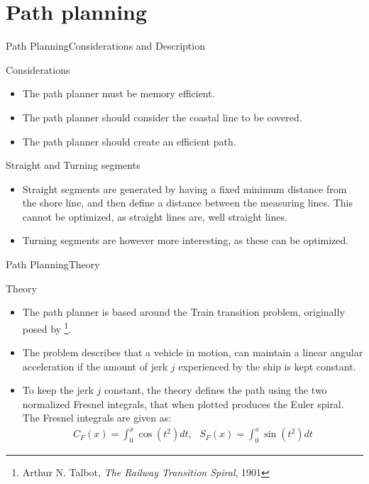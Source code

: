 \documentclass[10pt]{beamer}
\begin{document}
\section{Path planning}
\begin{frame}{Path Planning}{Considerations and Description}
    \begin{block}{Considerations}
    \begin{itemize}
    	\item The path planner must be memory efficient.
    	\item The path planner should consider the coastal line to be covered.
    	\item The path planner should create an efficient path.
    \end{itemize}
    \end{block}
    \begin{block}{Straight and Turning segments}
    \begin{itemize}
    	\item Straight segments are generated by having a fixed minimum distance from the shore line, and then define a distance between the measuring lines. This cannot be optimized, as straight lines are, well straight lines. 
    	\item Turning segments are however more interesting, as these can be optimized.
    \end{itemize}
    \end{block}
\end{frame}

\begin{frame}{Path Planning}{Theory}
  \begin{block}{Theory}
  \begin{itemize}
     \item<1-> The path planner is based around the Train transition problem, originally posed by \footnote{Arthur N. Talbot, \textit{The Railway Transition Spiral}, 1901}.
    \item<2-> The problem describes that a vehicle in motion, can maintain a linear angular acceleration if the amount of jerk $j$ experienced by the ship is kept constant.
    \item<3-> To keep the jerk $j$ constant, the theory defines the path using the two normalized Fresnel integrals, that when plotted produces the Euler spiral. The Fresnel integrals are given as:
    \begin{align}
    C_F(x) = \int_0^x \cos(t^2)dt,\,\,\,\,S_F(x) = \int_0^x \sin(t^2)dt
\label{eq:fresnel}
    \end{align}
  \end{itemize}
  \end{block}
\end{frame}
\end{document}
